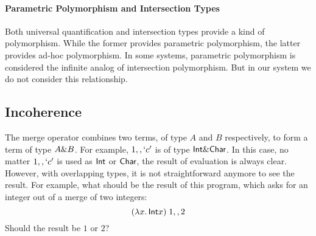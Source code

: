 \begin{comment}
\noindent is a \emph{subtype} of both \lstinline{Int -> String} and
\lstinline{Bool -> String}. This is why \lstinline{show} can take
\lstinline{100} as its argument. Generally speaking an intersection type
\lstinline{A & B} is a subtype of both \lstinline{A} and \lstinline{B}.
Moreover, subtyping of intersection types in \name is purely structural
and it enjoys of properties such as \emph{idempotence},
\emph{commutativity} and \emph{associativity}
(equality is defined as bidirectional subtyping relation): \\


\begin{tabular}{llrcl}
  \textbf{Idempotent}  & $A \inter A$            & $=$ & $A$ \\
  \textbf{Commutative} & $A \inter B$            & $=$ & $B \inter A$ \\
  \textbf{Associative} & $(A \inter B) \inter C$ & $=$ & $A \inter (B \inter C)$
\end{tabular}
\end{comment}

\paragraph{Parametric Polymorphism and Intersection Types}
Both universal quantification and intersection types provide a kind of
polymorphism. While the former provides parametric polymorphism, the latter
provides ad-hoc polymorphism. In some systems, parametric polymorphism is
considered the infinite analog of intersection polymorphism. But in our system
we do not consider this relationship.  

\subsection{Incoherence}
The merge operator combines two terms, of type $A$ and $B$
respectively, to form a term of type $A \& B$. For example, $1 ,,
`c'$ is of type $\textsf{Int} \& \textsf{Char}$. In this case, no matter $1 ,,
`c'$ is used as $\textsf{Int}$ or $\textsf{Char}$, the result of evaluation is always
clear. However, with overlapping types, it is not straightforward anymore to
see the result. For example, what should be the result of this program, which
asks for an integer out of a merge of two integers:
\[ (\lambda x.\, \textsf{Int} x) \; 1 ,, 2 \]
Should the result be $1$ or $2$?


